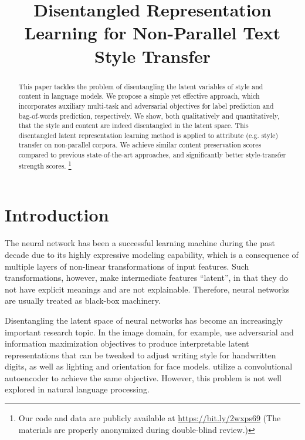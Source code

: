 \documentclass[letterpaper]{article} %
\title{Disentangled Representation Learning for Non-Parallel Text Style Transfer}
\date{}
\newcommand{\citeay}[1]{\citeauthor{#1} \shortcite{#1}}
\begin{document}
\maketitle
\graphicspath{{images/}}

\begin{abstract}
	This paper tackles the problem of disentangling the latent variables of style and content in language models.
	We propose a simple yet effective approach, which incorporates auxiliary multi-task and adversarial objectives for label prediction and bag-of-words prediction, respectively.
	We show, both qualitatively and quantitatively, that the style and content are indeed disentangled in the latent space.
	This disentangled latent representation learning method is applied to attribute (e.g. style) transfer on non-parallel corpora.
	We achieve similar content preservation scores compared to previous state-of-the-art approaches, and significantly better style-transfer strength scores.
	\footnote{Our code and data are publicly available at \url{https://bit.ly/2wxps69} (The materials are properly anonymized during double-blind review.)}
\end{abstract}

% 


\section{Introduction}

The neural network has been a successful learning machine during the past decade due to its highly expressive modeling capability, which is a consequence of multiple layers of non-linear transformations of input features.
Such transformations, however, make intermediate features ``latent'', in that they do not have explicit meanings and are not explainable.
Therefore, neural networks are usually treated as black-box machinery.

Disentangling the latent space of neural networks has become an increasingly important research topic.
In the image domain, for example, \citeay{chen2016infogan} use adversarial and information maximization objectives to produce interpretable latent representations that can be tweaked to adjust writing style for handwritten digits, as well as lighting and orientation for face models.
\citeay{mathieu2016disentangling} utilize a convolutional autoencoder to achieve the same objective.
However, this problem is not well explored in natural language processing.
\end{document}
